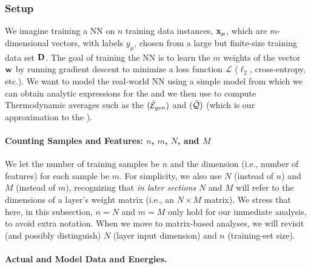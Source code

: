 \subsubsection{Setup}
\label{sxn:mathP_setup}



We imagine training a NN on $n$ training data instances, ${\mathbf{x}}_{\mu}$, which are $m$-dimensional vectors,
with labels $y_{\mu}$, chosen from a large but finite-size training data set $\mathbf{D}$.
The goal of training the NN is to learn the $m$ weights of the vector ${\mathbf{w}}$ by running gradient descent to minimize
a loss function $\mathcal{L}$ ($\ell_2$, cross-entropy, etc.). 
We want to model the real-world NN using a simple model from which we can obtain 
analytic expressions for the \emph{\FreeEnergy} and \emph{\GeneratingFunction} we then use to compute
Thermodynamic averages such as the \emph{\AverageGeneralizationError} $(\bar{\mathcal{E}}_{gen})$ and
\emph{\ModelQuality} $(\bar{\mathcal{Q}})$ (which is our approximation to the \emph{\AverageGeneralizationAccuracy}).

\paragraph{Counting Samples and Features: $n$, $m$, $N$, and $M$}
We let the number of training samples be $n$ and the dimension 
(i.e., number of features) for each sample be $m$.  For simplicity, 
we also use $N$ (instead of $n$) and $M$ (instead of $m$), recognizing that 
\emph{in later sections} $N$ and $M$ will refer to the dimensions 
of a layer’s weight matrix (i.e., an $N \times M$ matrix). 
We stress that here, in this subsection,  $n = N$ and $m = M$ only hold for our immediate analysis, 
to avoid extra notation. When we move to matrix-based analyses, 
we will revisit (and possibly distinguish) $N$ (layer input dimension) and $n$ (training-set size).

\paragraph{Actual and Model Data and Energies.}


